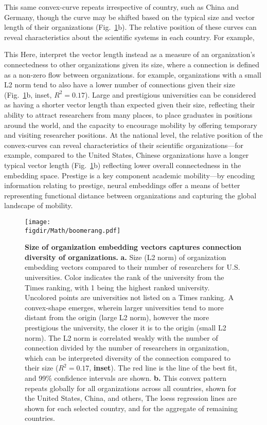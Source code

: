 \documentclass[12pt]{article} %
\def\figdir{../Figs}
\begin{document}
This same convex-curve repeats irrespective of country, such as China and Germany, though the curve may be shifted based on the typical size and vector length of their organizations (Fig.~\ref{fig:length}b). 
The relative position of these curves can reveal characteristics about the scientific systems in each country. 
For example, 

This 
Here, interpret the vector length instead as a measure of an organization's connectedness to other organizations given its size, where a connection is defined as a non-zero flow between organizations.
for example, organizations with a small L2 norm tend to also have a lower number of connections given their size (Fig.~\ref{fig:length}b, inset, $R^{2} = 0.17$). 
Large and prestigious universities can be considered as having a shorter vector length than expected given their size, reflecting their ability to attract researchers from many places, to place graduates in positions around the world, and the capacity to encourage mobility by offering temporary and visiting researcher positions. 
At the national level, the relative position of the convex-curves can reveal characteristics of their scientific organizations—for example, compared to the United States, Chinese organizations have a longer typical vector length (Fig.~\ref{fig:length}b) reflecting lower overall connectedness in the embedding space. 
Prestige is a key component academic mobility—by encoding information relating to prestige, neural embeddings offer a means of better representing functional distance between organizations and capturing the global landscape of mobility. 


%
%
\begin{figure}[h!]
	\centering
	\texttt{[image: \\figdir/Math/boomerang.pdf]}
	\caption{
		\textbf{Size of organization embedding vectors captures connection diversity of organizations.}
		\textbf{a.} Size (L2 norm) of organization embedding vectors compared to their number of researchers for U.S. universities.
		Color indicates the rank of the university from the Times ranking, with 1 being the highest ranked university.
		Uncolored points are universities not listed on a Times ranking.
		A convex-shape emerges, wherein larger universities tend to more distant from the origin (large L2 norm), however the more prestigious the university, the closer it is to the origin (small L2 norm). 
		The L2 norm is correlated weakly with the number of connection divided by the number of researchers in organization, which can be interpreted diversity of the connection compared to their size ($R^{2} = 0.17$, \textbf{inset}).
		The red line is the line of the best fit, and 99\% confidence intervals are shown. 
		\textbf{b.} This convex pattern repeats globally for all organizations across all countries, shown for the United States, China, and others,
		The loess regression lines are shown for each selected country, and for the aggregate of remaining countries. 
	}
	\label{fig:length}
\end{figure}
\end{document}
